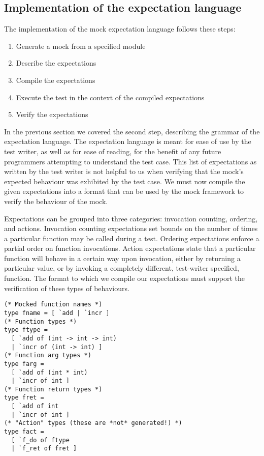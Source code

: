 \subsection{Implementation of the expectation language}
\label{application:mock_impl}


The implementation of the mock expectation language follows these
steps:

\begin{enumerate}
\item Generate a mock from a specified module
\item Describe the expectations
\item Compile the expectations
\item Execute the test in the context of the compiled expectations
\item Verify the expectations
\end{enumerate}

In the previous section we covered the second step, describing the
grammar of the expectation language. The expectation language is meant
for ease of use by the test writer, as well as for ease of reading,
for the benefit of any future programmers attempting to understand the
test case. This list of expectations as written by the test writer is
not helpful to us when verifying that the mock's expected behaviour was
exhibited by the test case. We must now compile the given expectations
into a format that can be used by the mock framework to verify the
behaviour of the mock.

Expectations can be grouped into three categories: invocation
counting, ordering, and actions. Invocation counting expectations set
bounds on the number of times a particular function may be called
during a test. Ordering expectations enforce a partial order on
function invocations. Action expectations state that a particular
function will behave in a certain way upon invocation, either by
returning a particular value, or by invoking a completely different,
test-writer specified, function. The format to which we compile our
expectations must support the verification of these types of
behaviours.


\begin{lstlisting}[aboveskip=\baselineskip,
    caption=Example of types needed for a generated mock module,
    label=code:simple_mock_types]
(* Mocked function names *)
type fname = [ `add | `incr ]
(* Function types *)
type ftype =
  [ `add of (int -> int -> int)
  | `incr of (int -> int) ]
(* Function arg types *)
type farg =
  [ `add of (int * int)
  | `incr of int ]
(* Function return types *)
type fret =
  [ `add of int
  | `incr of int ]
(* "Action" types (these are *not* generated!) *)
type fact =
  [ `f_do of ftype
  | `f_ret of fret ]
\end{lstlisting}

